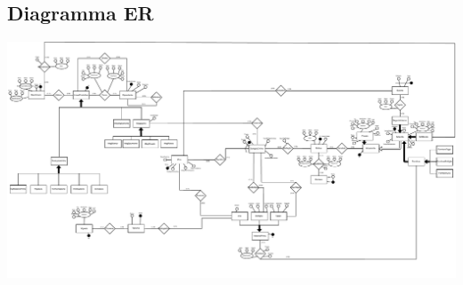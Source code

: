 \subsection{Diagramma ER}
\centerline{\includegraphics[width=18cm,keepaspectratio,angle=0]{src/progettazioneConcettuale/assests/cantina_ER.pdf}}